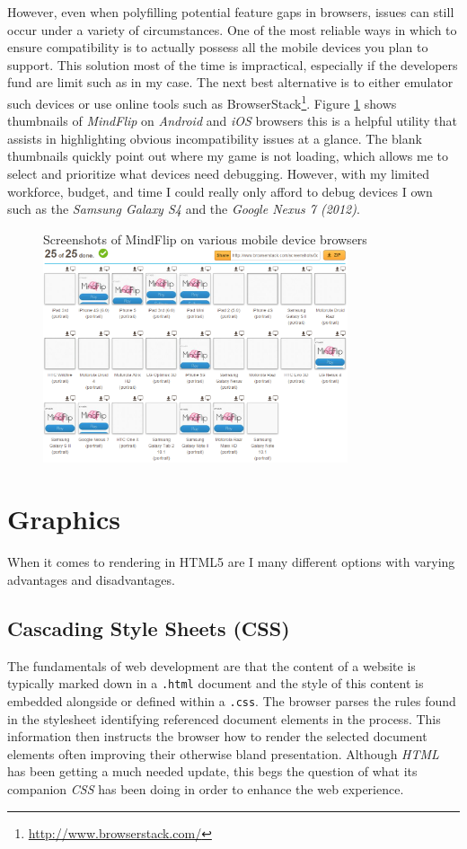 \documentclass[final]{cmpreport}
\begin{document}
However, even when polyfilling potential feature gaps in browsers, issues can still occur under a variety of circumstances. One of the most reliable ways in which to ensure compatibility is to actually possess all the mobile devices you plan to support. This solution most of the time is impractical, especially if the developers fund are limit such as in my case. The next best alternative is to either emulator such devices or use online tools such as BrowserStack\footnote{\url{http://www.browserstack.com/}}. Figure \ref{browserstack} shows thumbnails of \textit{MindFlip} on \textit{Android} and \textit{iOS} browsers this is a helpful utility that assists in highlighting obvious incompatibility issues at a glance. The blank thumbnails quickly point out where my game is not loading, which allows me to select and prioritize what devices need debugging. However, with my limited workforce, budget, and time I could really only afford to debug devices I own such as the \textit{Samsung Galaxy S4} and the \textit{Google Nexus 7 (2012)}.

\begin{figure}[h]{Screenshots of MindFlip on various mobile device browsers \label{browserstack}}
  \centering
    \includegraphics[width=0.8\textwidth]{browserstack.png}
\end{figure}

\section{Graphics}
When it comes to rendering in HTML5 are I many different options with varying advantages and disadvantages.

\subsection{Cascading Style Sheets (CSS)}
The fundamentals of web development are that the content of a website is typically marked down in a \texttt{.html} document and the style of this content is embedded alongside or defined within a \texttt{.css}. The browser parses the rules found in the stylesheet identifying referenced document elements in the process. This information then instructs the browser how to render the selected document elements often improving their otherwise bland presentation. Although \textit{HTML} has been getting a much needed update, this begs the question of what its companion \textit{CSS} has been doing in order to enhance the web experience. 
\end{document}
